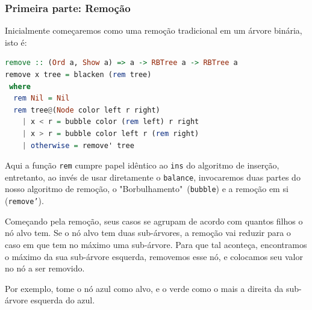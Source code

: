 \subsubsection{Primeira parte: Remoção}

Inicialmente começaremos como uma remoção tradicional em um árvore binária, isto é:

\begin{lstlisting}[language=haskell]
remove :: (Ord a, Show a) => a -> RBTree a -> RBTree a
remove x tree = blacken (rem tree)
 where
  rem Nil = Nil
  rem tree@(Node color left r right)
    | x < r = bubble color (rem left) r right
    | x > r = bubble color left r (rem right)
    | otherwise = remove' tree
\end{lstlisting}
\FloatBarrier

Aqui a função \texttt{rem} cumpre papel idêntico ao \texttt{ins} do algoritmo de inserção, entretanto, ao invés de usar diretamente o \texttt{balance}, invocaremos duas partes do nosso algoritmo de remoção, o "Borbulhamento"\ (\texttt{bubble}) e a remoção em si (\texttt{remove'}).

Começando pela remoção, seus casos se agrupam de acordo com quantos filhos o nó alvo tem. Se o nó alvo tem duas sub-árvores, a remoção vai reduzir para o caso em que tem no máximo uma sub-árvore. Para que tal aconteça, encontramos o máximo da sua sub-árvore esquerda, removemos esse nó, e colocamos seu valor no nó a ser removido.

Por exemplo, tome o nó azul como alvo, e o verde como o mais a direita da sub-árvore esquerda do azul.

